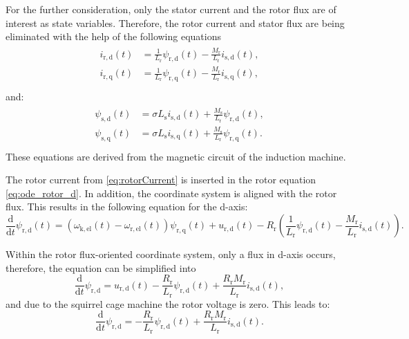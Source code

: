 \begin{solutionblock}
    For the further consideration, only the stator current and the rotor flux are of interest as state variables. Therefore, the rotor current and stator flux are being eliminated with the help of the following equations
    \begin{align}
        \begin{split}
            i_{\mathrm{r,d}}(t) &= \frac{1}{L_{\mathrm{r}}} \psi_{\mathrm{r,d}}(t) - \frac{M_{\mathrm{r}}}{L_{\mathrm{r}}}i_{\mathrm{s,d}}(t), \\
            i_{\mathrm{r,q}}(t) &= \frac{1}{L_{\mathrm{r}}} \psi_{\mathrm{r,q}}(t) - \frac{M_{\mathrm{r}}}{L_{\mathrm{r}}}i_{\mathrm{s,q}}(t), \\
        \end{split}
        \label{eq:rotorCurrent}
    \end{align}
    and:
    \begin{align}
        \begin{split}
            \psi_{\mathrm{s,d}}(t) &= \sigma L_{\mathrm{s}} i_{\mathrm{s,d}}(t) + \frac{M_{\mathrm{s}}}{L_{\mathrm{r}}} \psi_{\mathrm{r,d}}(t), \\
            \psi_{\mathrm{s,q}}(t) &= \sigma L_{\mathrm{s}} i_{\mathrm{s,q}}(t) + \frac{M_{\mathrm{s}}}{L_{\mathrm{r}}} \psi_{\mathrm{r,q}}(t). \\
        \end{split}
        \label{eq:statorFlux}
    \end{align}
    These equations are derived from the magnetic circuit of the induction machine.


    The rotor current from \eqref{eq:rotorCurrent} is inserted in the rotor equation \eqref{eq:ode_rotor_d}. In addition, the coordinate system is aligned with the rotor flux.
    This results in the following equation for the d-axis:
    \begin{equation}
        \frac{\mathrm{d}}{\mathrm{d}t} \psi_{\mathrm{r,d}}(t) = (\omega_{\mathrm{k,el}}(t)-\omega_{\mathrm{r,el}}(t))\psi_{\mathrm{r,q}}(t) + u_{\mathrm{r,d}}(t) - R_{\mathrm{r}} \left(\frac{1}{L_{\mathrm{r}}} \psi_{\mathrm{r,d}}(t) - \frac{M_{\mathrm{r}}}{L_{\mathrm{r}}}i_{\mathrm{s,d}}(t) \right).
    \end{equation}
    
    Within the rotor flux-oriented coordinate system, only a flux in d-axis occurs, therefore, the equation can be simplified into
    \begin{equation}
        \frac{\mathrm{d}}{\mathrm{d}t}\psi_{\mathrm{r,d}} = u_{\mathrm{r,d}}(t) - \frac{R_{\mathrm{r}}}{L_{\mathrm{r}}} \psi_{\mathrm{r,d}}(t) + \frac{R_{\mathrm{r}}M_{\mathrm{r}}}{L_{\mathrm{r}}}i_{\mathrm{s,d}}(t),
    \end{equation}
    and due to the squirrel cage machine the rotor voltage is zero. This leads to:
    \begin{equation}
        \frac{\mathrm{d}}{\mathrm{d}t}\psi_{\mathrm{r,d}} = - \frac{R_{\mathrm{r}}}{L_{\mathrm{r}}} \psi_{\mathrm{r,d}}(t) + \frac{R_{\mathrm{r}}M_{\mathrm{r}}}{L_{\mathrm{r}}}i_{\mathrm{s,d}}(t).
    \end{equation}


\end{solutionblock}
